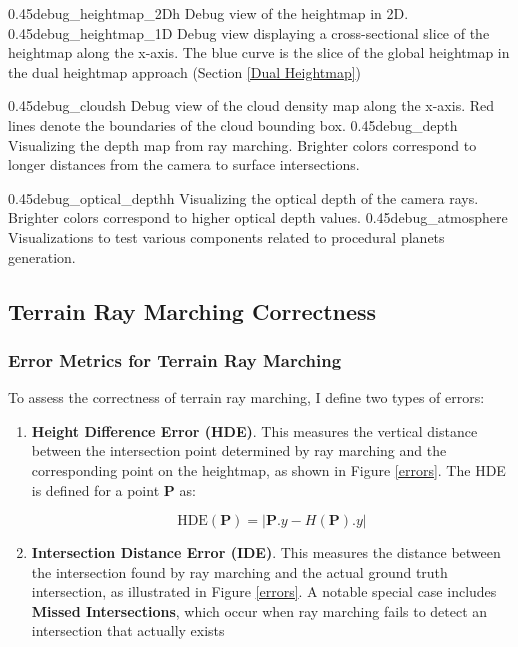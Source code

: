 \myfigurerow
{0.45}{debug_heightmap_2D}{h}
{Debug view of the heightmap in 2D.}
{0.45}{debug_heightmap_1D}
{Debug view displaying a cross-sectional slice of the heightmap along the x-axis. The blue curve is the slice of the global heightmap in the dual heightmap approach (Section \ref{Dual Heightmap})}

\myfigurerow
{0.45}{debug_clouds}{h}
{Debug view of the cloud density map along the x-axis. Red lines denote the boundaries of the cloud bounding box.}
{0.45}{debug_depth}
{Visualizing the depth map from ray marching. Brighter colors correspond to longer distances from the camera to surface intersections.}

\myfigurerow
{0.45}{debug_optical_depth}{h}
{Visualizing the optical depth of the camera rays. Brighter colors correspond to higher optical depth values.}
{0.45}{debug_atmosphere}
{Visualizations to test various components related to procedural planets generation.}

\subsection{Terrain Ray Marching Correctness}

\subsubsection{Error Metrics for Terrain Ray Marching}

To assess the correctness of terrain ray marching, I define two types of errors:
\begin{enumerate}
    \item \textbf{Height Difference Error (HDE)}. This measures the vertical distance between the intersection point determined by ray marching and the corresponding point on the heightmap, as shown in Figure \ref{errors}. The HDE is defined for a point $\mathbf{P}$ as:

\begin{equation}
    \text{HDE}(\mathbf{P})=|\mathbf{P}.y-H(\mathbf{P}).y|
\end{equation}

    \item \textbf{Intersection Distance Error (IDE)}. This measures the distance between the intersection found by ray marching and the actual ground truth intersection, as illustrated in Figure \ref{errors}. A notable special case includes \textbf{Missed Intersections}, which occur when ray marching fails to detect an intersection that actually exists
\end{enumerate}

